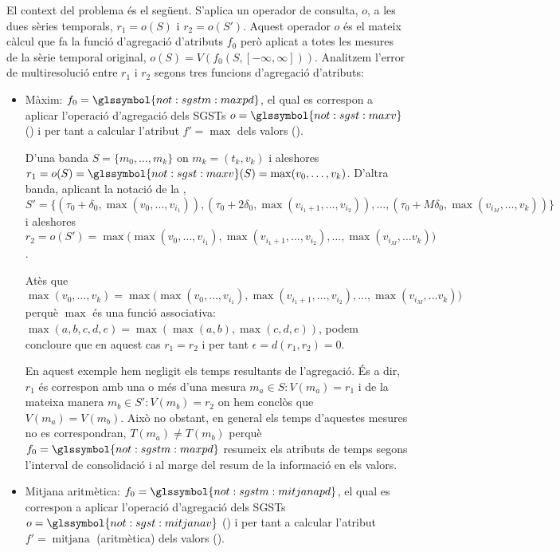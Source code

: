 El context del problema és el següent. S'aplica un operador de
consulta, $o$, a les dues sèries temporals, $r_1=o(S)$ i $r_2=o(S')$.
Aquest operador $o$ és el mateix càlcul que fa la funció d'agregació
d'atributs $f_0$ però aplicat a totes les mesures de la sèrie temporal
original, $o(S)=V(f_0(S,[-\infty,\infty]))$. Analitzem l'error de
multiresolució entre $r_1$ i $r_2$ segons tres funcions d'agregació
d'atributs:

  \begin{itemize}
  \item Màxim: $f_0=\glssymbol{not:sgstm:maxpd}$, el qual es correspon
    a aplicar l'operació d'agregació dels \glspl{SGST}
    $o=\glssymbol{not:sgst:maxv}$ () i per
    tant a calcular l'atribut $f'=\max$ dels valors ().

    D'una banda $S=\{m_0,\dotsc,m_k\}$ on $m_k=(t_k,v_k)$ i aleshores
    $r_1=o(S)=\glssymbol{not:sgst:maxv}(S) = \max(v_0,\dotsc,
    v_k)$. D'altra banda, aplicant la notació de la
    , $S'=\{ (\tau_0+\delta_0,
    \max(v_0,\dotsc,v_{i_1})),
    (\tau_0+2\delta_0,\max(v_{i_1+1},\dotsc,v_{i_2})), \dotsc,
    (\tau_0+M\delta_0,\max(v_{i_M}, \dotsc, v_k)) \}$ i aleshores
    $r_2=o(S')= \max\big( \max(v_0,\dotsc,v_{i_1}),
    \max(v_{i_1+1},\dotsc,v_{i_2}), \dotsc, \max(v_{i_M}, \dotsc v_k)
    \big)$.

    Atès que $\max(v_0,\dotsc, v_k) = \max\big(
    \max(v_0,\dotsc,v_{i_1}), \max(v_{i_1+1},\dotsc,v_{i_2}), \dotsc,
    \max(v_{i_M}, \dotsc v_k) \big)$ perquè $\max$ és una funció
    associativa: $\max(a,b,c,d,e) = \max( \max(a,b), \max(c,d,e))$,
    podem concloure que en aquest cas $r_1=r_2$ i per tant
    $\epsilon=d(r_1,r_2)=0$.


    En aquest exemple hem negligit els temps resultants de
    l'agregació. És a dir, $r_1$ és correspon amb una o més d'una
    mesura $m_a\in S: V(m_a)=r_1$ i de la mateixa manera $m_b\in S':
    V(m_b)=r_2$ on hem conclòs que $V(m_a)=V(m_b)$. Això no obstant,
    en general els temps d'aquestes mesures no es correspondran,
    $T(m_a)\neq T(m_b)$ perquè $f_0=\glssymbol{not:sgstm:maxpd}$
    resumeix els atributs de temps segons l'interval de consolidació i
    al marge del resum de la informació en els valors.



  \item Mitjana aritmètica: $f_0=\glssymbol{not:sgstm:mitjanapd}$, el
    qual es correspon a aplicar l'operació d'agregació dels
    \glspl{SGST} $o=\glssymbol{not:sgst:mitjanav}$
    () i per tant a calcular l'atribut
    $f'=\operatorname{mitjana}$ (aritmètica) dels valors
    ().


\end{itemize}
